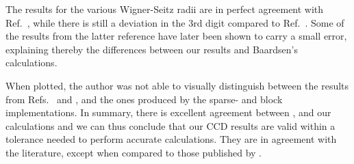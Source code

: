 The results for the various Wigner-Seitz radii are in perfect
agreement with Ref.~\cite{Baardsen2014}, while there is still
a deviation in the 3rd digit compared to Ref.~\cite{Roggero2013}.  
Some of the results from the latter reference have later been shown to carry a small error, explaining
thereby the differences between our results and Baardsen's calculations.

When plotted, the author was not able to visually distinguish between
the results from Refs.~\cite{Shepherd2012} and \cite{Baardsen2015},
and the ones produced by the sparse- and block implementations. 
In summary, there is excellent agreement  between
\cite{Shepherd2012}, \cite{Baardsen2015} and our calculations and we can thus conclude
that our CCD results are valid within a tolerance needed to
perform accurate calculations. They are in agreement with the
literature, except when compared to those published by
\cite{Roggero2013}. 
